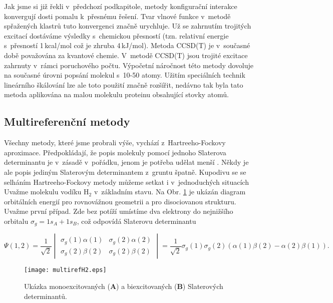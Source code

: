 Jak jsme si již řekli v~předchozí podkapitole, metody konfigurační interakce konvergují dosti pomalu k~přesnému řešení. Tvar vlnové funkce v~metodě spřažených klastrů tuto konvergenci značně urychluje. Už se zahrnutím trojitých excitací dostáváme výsledky s~chemickou přesností (tzn. relativní energie s~přesností 1\,kcal/mol což je zhruba 4\,kJ/mol).
Metoda CCSD(T) je v~současné době považována za  kvantové chemie. V~metodě CCSD(T) jsou trojité excitace zahrnuty v~rámci poruchového počtu. Výpočetní náročnost této metody dovoluje na současné úrovni popsání molekul s~10-50
atomy. Užitím speciálních technik lineárního škálování lze ale toto použití značně rozšířit, nedávno tak byla tato metoda aplikována na malou molekulu proteinu obsahující stovky atomů. 

\subsection{Multireferenční metody}

Všechny metody, které jsme probrali výše, vychází z~Hartreeho-Fockovy aproximace. Předpokládají, že popis molekuly pomocí jednoho Slaterova determinantu je v~zásadě v~pořádku, jenom je potřeba udělat menší . Někdy je ale popis jediným Slaterovým determinantem z~gruntu špatně. Kupodivu se se selháním Hartreeho-Fockovy metody můžeme setkat i v~jednoduchých situacích Uvažme molekulu vodíku H$_2$ v~základním stavu. Na Obr. \ref{obr:abinitio:multirefH2} je ukázán diagram orbitálních energií pro rovnovážnou geometrii a pro disociovanou strukturu. Uvažme první případ. Zde bez potíží umístíme dva elektrony do nejnižšího orbitalu $\sigma_g=1s_A+1s_B$, což odpovídá Slaterovu determinantu

\begin{equation}
\Psi (1,2)=\frac{1}{\sqrt{2}}
\begin{vmatrix}
\sigma_g(1)\alpha (1) & \sigma_g(2)\alpha (2) \\
\sigma_g(2)\beta (2) & \sigma_g(2)\beta (2)
\end{vmatrix}
=\frac{1}{\sqrt{2}}\sigma_g(1)\sigma_g(2)(\alpha (1)\beta (2)-\alpha (2)\beta (1)) .
\label{rov:abinitio:SDH2}
\end{equation}

\begin{figure} [htb]
\centering
\texttt{[image: multirefH2.eps]}
\caption[Disociace molekuly vodíku]{Ukázka monoexcitovaných (\textbf{A}) a biexcitovaných (\textbf{B}) Slaterových determinantů.}
\label{obr:abinitio:multirefH2}
\end{figure}

